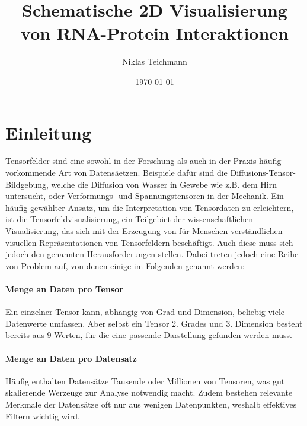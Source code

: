 \documentclass[a4paper,fontsize=12pt,toc=bib,halfparskip]{scrartcl}
\title{Schematische 2D Visualisierung von RNA-Protein Interaktionen\xspace}
\author{Niklas Teichmann}
\date{\today}
\begin{document}
\maketitle\clearpage
\thispagestyle{empty}
\tableofcontents\clearpage
{}


\section{Einleitung}
Tensorfelder sind eine sowohl in der Forschung als auch in der Praxis h\"aufig vorkommende Art von Datens\"aetzen. Beispiele daf\"ur sind die Diffusions-Tensor-Bildgebung\cite{basser1994mr}, welche die Diffusion von Wasser in Gewebe wie z.B. dem Hirn untersucht, oder Verformungs-\cite[S.~122]{FundamentalsofStructuralMechanics} und Spannungstensoren\cite[S.~154]{FundamentalsofStructuralMechanics} in der Mechanik. Ein h\"aufig gew\"ahlter Ansatz, um die Interpretation von Tensordaten zu erleichtern, ist die Tensorfeldvisualisierung, ein Teilgebiet der wissenschaftlichen Visualisierung, das sich mit der Erzeugung von f\"ur Menschen verst\"andlichen visuellen Repr\"asentationen von Tensorfeldern besch\"aftigt. Auch diese muss sich jedoch den genannten Herausforderungen stellen. Dabei treten jedoch eine Reihe von Problem auf, von denen einige im Folgenden genannt werden\cite{hlawitschka2014top}\cite{fritzsch2016contiuousScatterplot}:

\paragraph{Menge an Daten pro Tensor}
Ein einzelner Tensor kann, abh\"angig von Grad und Dimension, beliebig viele Datenwerte umfassen. Aber selbst ein Tensor 2. Grades und 3. Dimension besteht bereits aus 9 Werten, f\"ur die eine passende Darstellung gefunden werden muss.

\paragraph{Menge an Daten pro Datensatz}
H\"aufig enthalten Datens\"atze Tausende oder Millionen von Tensoren, was gut skalierende Werzeuge zur Analyse notwendig macht. Zudem bestehen relevante Merkmale der Datens\"atze oft nur aus wenigen Datenpunkten, weshalb effektives Filtern wichtig wird.
\end{document}
